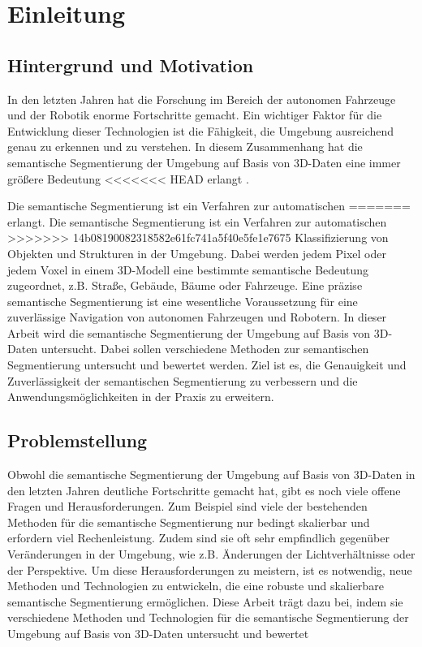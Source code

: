 \chapter{Einleitung}
\section{Hintergrund und Motivation}

In den letzten Jahren hat die Forschung im Bereich der autonomen Fahrzeuge und
der Robotik enorme Fortschritte gemacht. Ein wichtiger Faktor für die
Entwicklung dieser Technologien ist die Fähigkeit, die Umgebung ausreichend
genau zu erkennen und zu verstehen. In diesem Zusammenhang hat die semantische
Segmentierung der Umgebung auf Basis von 3D-Daten eine immer größere Bedeutung
<<<<<<< HEAD
erlangt \cite{Hoss.2022}. 

Die semantische Segmentierung ist ein Verfahren zur automatischen
=======
erlangt. Die semantische Segmentierung ist ein Verfahren zur automatischen
>>>>>>> 14b08190082318582e61fc741a5f40e5fe1e7675
Klassifizierung von Objekten und Strukturen in der Umgebung. Dabei werden jedem
Pixel oder jedem Voxel in einem 3D-Modell eine bestimmte semantische Bedeutung
zugeordnet, z.B. Straße, Gebäude, Bäume oder Fahrzeuge. Eine präzise
semantische Segmentierung ist eine wesentliche Voraussetzung für eine
zuverlässige Navigation von autonomen Fahrzeugen und Robotern.
In dieser Arbeit wird die semantische Segmentierung der Umgebung auf Basis von
3D-Daten untersucht. Dabei sollen verschiedene Methoden zur semantischen
Segmentierung untersucht und bewertet werden. Ziel ist es, die Genauigkeit und
Zuverlässigkeit der semantischen Segmentierung zu verbessern und die
Anwendungsmöglichkeiten in der Praxis zu erweitern.

\section{Problemstellung}

Obwohl die semantische Segmentierung der Umgebung auf Basis von 3D-Daten in den
letzten Jahren deutliche Fortschritte gemacht hat, gibt es noch viele offene
Fragen und Herausforderungen. Zum Beispiel sind viele der bestehenden Methoden
für die semantische Segmentierung nur bedingt skalierbar und erfordern viel
Rechenleistung. Zudem sind sie oft sehr empfindlich gegenüber Veränderungen in
der Umgebung, wie z.B. Änderungen der Lichtverhältnisse oder der Perspektive\cite{shin2007reincarnation}.
Um diese Herausforderungen zu meistern, ist es notwendig, neue Methoden und
Technologien zu entwickeln, die eine robuste und skalierbare semantische
Segmentierung ermöglichen. Diese Arbeit trägt dazu bei, indem sie verschiedene
Methoden und Technologien für die semantische Segmentierung der Umgebung auf
Basis von 3D-Daten untersucht und bewertet\cite{.4242023}



